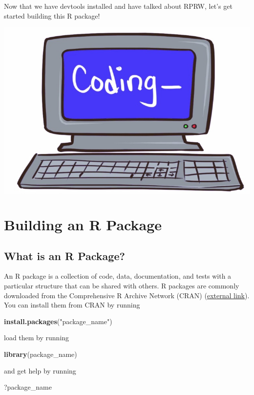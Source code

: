 \documentclass[
]{book}
\newenvironment{Shaded}{\begin{snugshade}}{\end{snugshade}}
\newcommand{\KeywordTok}[1]{\textcolor[rgb]{0.13,0.29,0.53}{\textbf{#1}}}
\newcommand{\NormalTok}[1]{#1}
\newcommand{\StringTok}[1]{\textcolor[rgb]{0.31,0.60,0.02}{#1}}
\begin{document}
Now that we have devtools installed and have talked about RPRW, let's get started building this R package!

\begin{center}\includegraphics[width=0.5\linewidth]{images/coding} \end{center}

\hypertarget{r-package}{%
\chapter{Building an R Package}\label{r-package}}

\hypertarget{what-is-an-r-package}{%
\section{What is an R Package?}\label{what-is-an-r-package}}

An R package is a collection of code, data, documentation, and tests with a particular structure that can be shared with others. R packages are commonly downloaded from the Comprehensive R Archive Network (CRAN) (\href{https://cran.r-project.org/}{external link}). You can install them from CRAN by running

\begin{Shaded}
\begin{Highlighting}[]
\KeywordTok{install.packages}\NormalTok{(}\StringTok{"package_name"}\NormalTok{)}
\end{Highlighting}
\end{Shaded}

load them by running

\begin{Shaded}
\begin{Highlighting}[]
\KeywordTok{library}\NormalTok{(package_name)}
\end{Highlighting}
\end{Shaded}

and get help by running

\begin{Shaded}
\begin{Highlighting}[]
\NormalTok{?package_name}
\end{Highlighting}
\end{Shaded}
\end{document}
